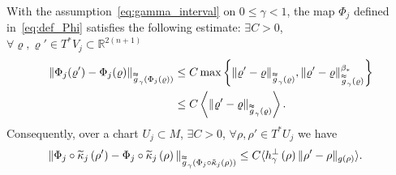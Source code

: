 \documentclass[10pt]{amsart}
\theoremstyle{definition}\newtheorem{defi}[theo]{Definition}\newtheorem{rema}[theo]{Remark}\newtheorem{exam}[theo]{Example}\newtheorem{exem}[theo]{Example}\newtheorem{nota}[theo]{Notation}
\newcommand{\bbR}{\mathbb{R}}
\let\oldtilde\tilde
\renewcommand*{\tilde}[1]{\mathchoice{\widetilde{#1}}{\widetilde{#1}}{\oldtilde{#1}}{\oldtilde{#1}}}
\let\oldexists\exists
\renewcommand*{\exists}{\mathrel{\oldexists}}
\let\oldforall\forall
\renewcommand*{\forall}{\mathrel{\oldforall}}
\begin{document}
\begin{cBoxB}{}
\begin{prop}
With the assumption~\eqref{eq:gamma_interval} on $0\leq\gamma<1$, the map $\Phi_{j}$ defined in~\eqref{eq:def_Phi} satisfies the following estimate: $\exists C>0$, $\forall\varrho,\varrho'\in T^{*}V_{j}\subset\bbR^{2(n+1)}$
\begin{equation}\label{eq:Phi_Lipchitz}
\begin{split}
\left\|\Phi_{j}(\varrho')-\Phi_{j}(\varrho)\right\|_{\overset{\thickapprox}{g}_{\gamma}\left(\Phi_{j}\left(\varrho\right)\right)} & \le C\max\left\{ \|\varrho'-\varrho\|_{\overset{\thickapprox}{g}_{\gamma}\left(\varrho\right)},\|\varrho'-\varrho\|_{\overset{\thickapprox}{g}_{\gamma}\left(\varrho\right)}^{\beta_{*}}\right\} 
\\
& \le C\left\langle\|\varrho'-\varrho\|_{\overset{\thickapprox}{g}_{\gamma}\left(\varrho\right)}\right\rangle.
\end{split}
\end{equation}
Consequently, over a chart $U_{j}\subset M$, $\exists C>0$, $\forall\rho,\rho'\in T^{*}U_{j}$ we have
\begin{align}\label{eq:Phi_Lipchitz-1}
\|\Phi_{j}\circ\tilde{\kappa}_{j}\left(\rho'\right)-\Phi_{j}\circ\tilde{\kappa}_{j}\left(\rho\right)\|_{\overset{\thickapprox}{g}_{\gamma}\left(\Phi_{j}\circ\tilde{\kappa}_{j}\left(\rho\right)\right)} & \le C\langle h_{\gamma}^{\perp}\left(\rho\right)\|\rho'-\rho\|_{g\left(\rho\right)}\rangle.
\end{align}
\end{prop}
\end{cBoxB}
\end{document}
